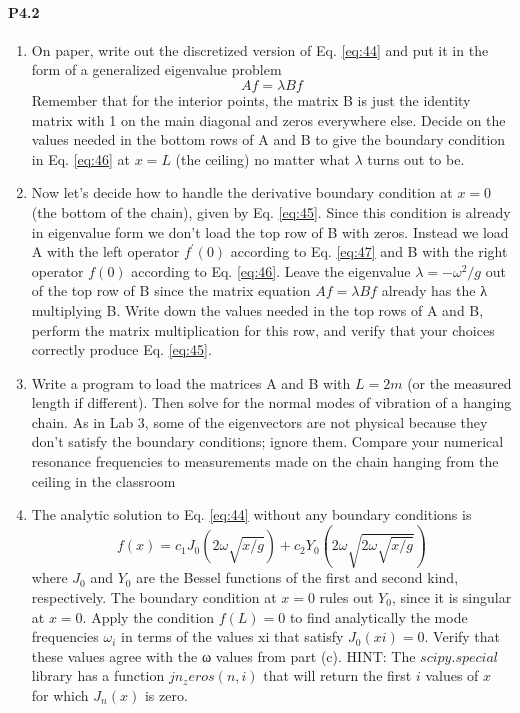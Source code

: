 				\paragraph*{P4.2}
				\begin{enumerate}[label=(\alph*)]
			\item	On paper, write out the discretized version of Eq. \eqref{eq:44} and put it in
the form of a generalized eigenvalue problem
\begin{equation}\label{eq:48}
		Af = \lambda B f
				\end{equation}
					Remember that for the interior points, the matrix B is just the identity
matrix with 1 on the main diagonal and zeros everywhere else. Decide on the values needed in the bottom rows of A and B to give the
boundary condition in Eq. \eqref{eq:46} at $x = L$ (the ceiling) no matter what
$\lambda$ turns out to be.
\item Now let\rq s decide how to handle the derivative boundary condition at
$x = 0$ (the bottom of the chain), given by Eq. \eqref{eq:45}. Since this condition
is already in eigenvalue form we don\rq t load the top row of B with zeros.
Instead we load A with the left operator $f^\prime (0)$ according to Eq. \eqref{eq:47}
and B with the right operator $f(0)$  according to Eq. \eqref{eq:46}. Leave the
eigenvalue $ \lambda = − \omega ^ 2
/g$ out of the top row of B since the matrix equation
$Af = \lambda Bf$ already has the λ multiplying B. Write down the values
needed in the top rows of A and B, perform the matrix multiplication
for this row, and verify that your choices correctly produce Eq. \eqref{eq:45}.
\item Write a program to load the matrices A and B with $L = 2 m$ (or the measured length if different). Then solve for the normal modes of vibration
of a hanging chain. As in Lab 3, some of the eigenvectors are not physical because they don\rq t satisfy the boundary conditions; ignore them.
Compare your numerical resonance frequencies to measurements
made on the chain hanging from the ceiling in the classroom
\item The analytic solution to Eq. \eqref{eq:44} without any boundary conditions is
\begin{equation*}
		f(x) = c_1J_0(2\omega \sqrt{x / g}) + c_2 Y_0(2\omega \sqrt{2\omega \sqrt{x / g}})
				\end{equation*}
				where $J_0$ and $Y_0$ are the Bessel functions of the first and second kind,
respectively. The boundary condition at $x = 0$ rules out $Y_0$, since it is
singular at $x = 0$. Apply the condition $f(L) = 0$ to find analytically the
mode frequencies $ \omega_i$
in terms of the values xi that satisfy $J_0(xi) = 0$.
Verify that these values agree with the ω values from part (c).
HINT: The $scipy.special$ library has a function $jn_zeros(n,i)$
that will return the first $i$ values of $x$ for which $J_n(x)$ is zero.
				\end{enumerate}
				

